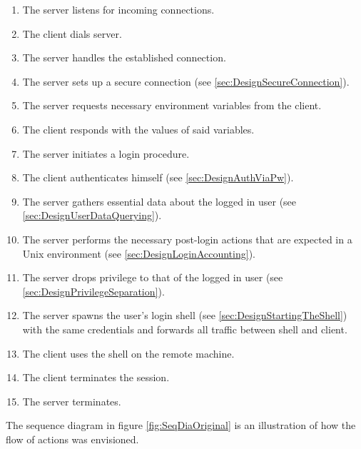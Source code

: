 \documentclass[10pt,a4paper,titlepage,twoside,english,final]{zhawreprt}
\begin{document}
\begin{enumerate}
\item The server listens for incoming connections.
\item The client dials server.
\item The server handles the established connection.
\item The server sets up a secure connection (see \ref{sec:DesignSecureConnection}).
\item The server requests necessary environment variables from the client.
\item The client responds with the values of said variables.
\item The server initiates a \gls{login} procedure.
\item The client authenticates himself (see \ref{sec:DesignAuthViaPw}).
\item The server gathers essential data about the logged in user (see \ref{sec:DesignUserDataQuerying}).
\item The server performs the necessary post-\gls{login} actions that are expected in a \gls{Unix} environment (see \ref{sec:DesignLoginAccounting}).
\item The server drops privilege to that of the logged in user (see \ref{sec:DesignPrivilegeSeparation}).
\item The server spawns the user's \gls{login} \gls{shell} (see \ref{sec:DesignStartingTheShell}) with the same credentials and forwards all traffic between \gls{shell} and client.
\item The client uses the \gls{shell} on the remote machine.
\item The client terminates the session.
\item The server terminates.
\end{enumerate}

The sequence diagram in figure \ref{fig:SeqDiaOriginal} is an illustration of how the flow of actions was envisioned.
\end{document}
